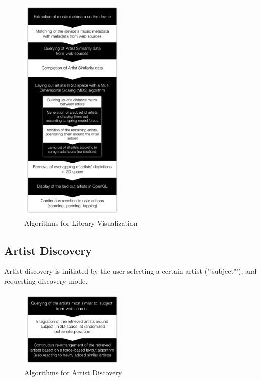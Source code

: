 \begin{figure}[H]
  \centering
    \includegraphics[width=0.45\textwidth]{figures/algorithm_flow_visualization}
  \caption{Algorithms for Library Visualization}
  \label{fig:algorithm_flow_visualization}
\end{figure}

\subsection{Artist Discovery}

Artist discovery is initiated by the user selecting a certain artist ("'subject"'), and requesting discovery mode.

\begin{figure}[H]
  \centering
    \includegraphics[width=0.45\textwidth]{figures/algorithm_flow_artist_discovery}
  \caption{Algorithms for Artist Discovery}
  \label{fig:algorithm_flow_artist_discovery}
\end{figure}


